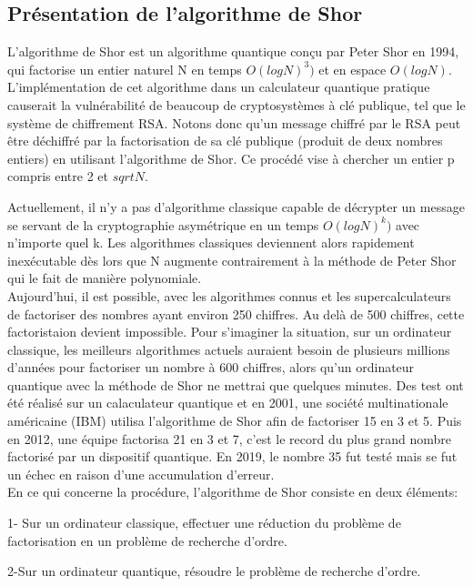 \documentclass[12pt]{article}
\begin{document}
\subsection{Présentation de l'algorithme de Shor}
L'algorithme de Shor est un algorithme quantique conçu par Peter Shor en 1994, qui factorise un entier naturel N en temps $O(log N)^3)$ et en espace $O(log N)$.
L'implémentation de cet algorithme dans un calculateur quantique pratique causerait la vulnérabilité de beaucoup de cryptosystèmes à clé publique, tel que le système de chiffrement RSA. Notons donc qu'un message chiffré par le RSA peut être déchiffré par la factorisation de sa clé publique (produit de deux nombres entiers) en utilisant l'algorithme de Shor. Ce procédé vise à chercher un entier p compris entre 2 et $sqrt{N}$.

Actuellement, il n'y a pas d'algorithme classique capable de décrypter un message se servant de la cryptographie asymétrique en un temps $O(log N)^k)$ avec n'importe quel k. Les algorithmes classiques deviennent alors rapidement inexécutable dès lors que N augmente contrairement à la méthode de Peter Shor qui le fait de manière polynomiale.
\\ 
Aujourd'hui, il est possible, avec les algorithmes connus et les supercalculateurs de factoriser des nombres ayant environ 250 chiffres. Au delà de 500 chiffres, cette factoristaion devient impossible. Pour s'imaginer la situation, sur un ordinateur classique, les meilleurs algorithmes actuels auraient besoin de plusieurs millions d'années pour factoriser un nombre à 600 chiffres, alors qu'un ordinateur quantique avec la méthode de Shor ne mettrai que quelques minutes. Des test ont été réalisé sur un calaculateur quantique et en 2001, une société multinationale américaine (IBM) utilisa l'algorithme de Shor afin de factoriser 15 en 3 et 5. Puis en 2012, une équipe factorisa 21 en 3 et 7, c'est le record du plus grand nombre factorisé par un dispositif quantique. En 2019, le nombre 35 fut testé mais se fut un échec en raison d'une accumulation d'erreur. 
\\
En ce qui concerne la procédure, l'algorithme de Shor consiste en deux éléments:

1- Sur un ordinateur classique, effectuer une réduction du problème de factorisation en un problème de recherche d'ordre.

2-Sur un ordinateur quantique, résoudre le problème de recherche d'ordre.
\end{document}
